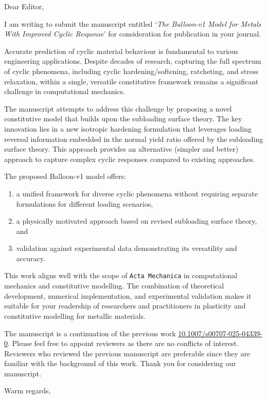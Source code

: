 \documentclass[a4paper,11pt]{letter}
\begin{document}
\onehalfspacing
\begin{letter}{}
    \address{IRIS Adlershof\\Humboldt-Universität zu Berlin\\Zum Großen Windkanal 2\\12489 Berlin, Germany}
    
    \opening{Dear Editor,}
    
    I am writing to submit the manuscript entitled `\textit{The Balloon-v1 Model for Metals With Improved Cyclic Response}' for consideration for publication in your journal.
    
    Accurate prediction of cyclic material behaviour is fundamental to various engineering applications.
    Despite decades of research, capturing the full spectrum of cyclic phenomena, including cyclic hardening/softening, ratcheting, and stress relaxation, within a single, versatile constitutive framework remains a significant challenge in computational mechanics.
    
    The manuscript attempts to address this challenge by proposing a novel constitutive model that builds upon the subloading surface theory.
    The key innovation lies in a new isotropic hardening formulation that leverages loading reversal information embedded in the normal yield ratio offered by the subloading surface theory.
    This approach provides an alternative (simpler and better) approach to capture complex cyclic responses compared to existing approaches.
    
    The proposed Balloon-v1 model offers:
    \begin{enumerate}
        \item a unified framework for diverse cyclic phenomena without requiring separate formulations for different loading scenarios,
        \item a physically motivated approach based on revised subloading surface theory, and
        \item validation against experimental data demonstrating its versatility and accuracy.
    \end{enumerate}
    
    This work aligns well with the scope of \texttt{Acta Mechanica} in computational mechanics and constitutive modelling.
    The combination of theoretical development, numerical implementation, and experimental validation makes it suitable for your readership of researchers and practitioners in plasticity and constitutive modelling for metallic materials.
    
    The manuscript is a continuation of the previous work \href{https://link.springer.com/article/10.1007/s00707-025-04339-0}{10.1007/s00707-025-04339-0}.
    Please feel free to appoint reviewers as there are no conflicts of interest.
    Reviewers who reviewed the previous manuscript are preferable since they are familiar with the background of this work.    
    Thank you for considering our manuscript.
    
    \signature{Dr. Theodore Chang}
    
    \closing{Warm regards,}
\end{letter}
\clearpage
\end{document}
